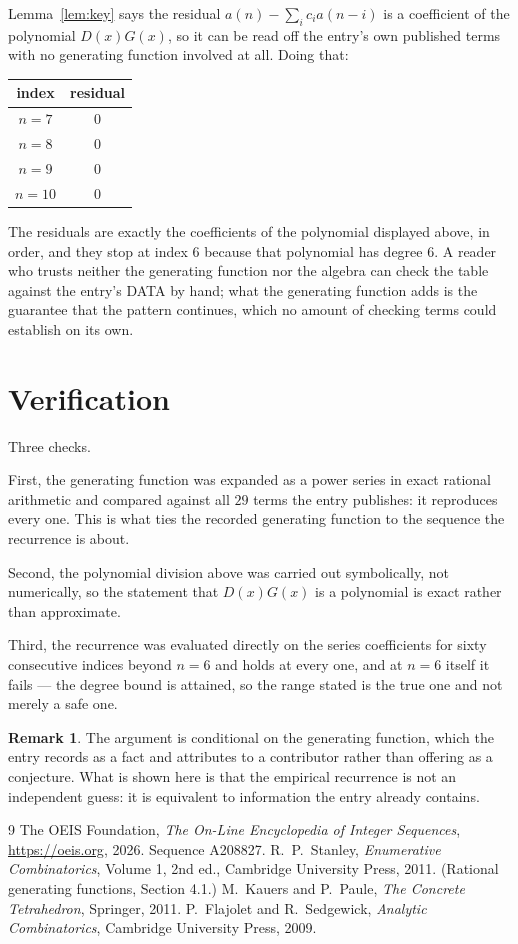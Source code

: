 \documentclass[11pt,a4paper]{article}
\theoremstyle{plain}
\theoremstyle{definition}
\newtheorem{remark}[theorem]{Remark}
\begin{document}
Lemma~\ref{lem:key} says the residual $a(n)-\sum_ic_ia(n-i)$ is a coefficient of the
polynomial $D(x)G(x)$, so it can be read off the entry's own published terms with no
generating function involved at all. Doing that:
\begin{center}
\begin{tabular}{cc}
index & residual \\ \hline
$n=7$ & $0$ \\
$n=8$ & $0$ \\
$n=9$ & $0$ \\
$n=10$ & $0$
\end{tabular}
\end{center}
The residuals are exactly the coefficients of the polynomial displayed above, in order, and
they stop at index $6$ because that polynomial has degree $6$. A reader who trusts
neither the generating function nor the algebra can check the table against the entry's DATA
by hand; what the generating function adds is the guarantee that the pattern continues, which
no amount of checking terms could establish on its own.

\section{Verification}

Three checks.

First, the generating function was expanded as a power series in exact rational arithmetic and
compared against all $29$ terms the entry publishes: it reproduces every one. This is
what ties the recorded generating function to the sequence the recurrence is about.

Second, the polynomial division above was carried out symbolically, not numerically, so the
statement that $D(x)G(x)$ is a polynomial is exact rather than approximate.

Third, the recurrence was evaluated directly on the series coefficients for sixty consecutive
indices beyond $n=6$ and holds at every one, and at $n=6$ itself it fails --- the
degree bound is attained, so the range stated is the true one and not merely a safe one.

\begin{remark}
The argument is conditional on the generating function, which the entry records as a fact and
attributes to a contributor rather than offering as a conjecture. What is shown here is that
the empirical recurrence is not an independent guess: it is equivalent to information the
entry already contains.
\end{remark}

\begin{thebibliography}{9}
 The OEIS Foundation, \emph{The On-Line Encyclopedia of Integer
Sequences}, \url{https://oeis.org}, 2026. Sequence A208827.
 R.~P.~Stanley, \emph{Enumerative Combinatorics}, Volume 1, 2nd ed.,
Cambridge University Press, 2011. (Rational generating functions, Section 4.1.)
 M.~Kauers and P.~Paule, \emph{The Concrete Tetrahedron}, Springer, 2011.
 P.~Flajolet and R.~Sedgewick, \emph{Analytic Combinatorics}, Cambridge
University Press, 2009.
\end{thebibliography}
\end{document}
